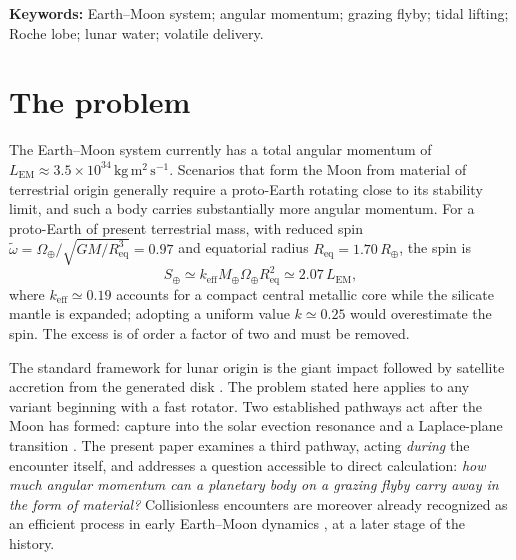 \documentclass[11pt,a4paper]{article}
\begin{document}
\begin{abstract}
The same calculation sharply delimits the scope of the mechanism. The lifted material does not itself reach the Roche limit once the encounter is inclined by the $20$--$25^\circ$ required to clear the disk; this channel therefore removes angular momentum without supplying the lunar mass. The angular-momentum vector carried away lies within $2^\circ$ of the spin axis, so the encounter does not compromise the observed obliquity. At the same time, the flyby geometry that optimizes this capture brings the perturber's own Roche lobe within reach of an expanded volatile envelope. In the proposed theory, this overflow would feed a volatile trail whose delayed reaccretion would supply mainly Earth's water and, to a lesser extent, contribute to the circumterrestrial reservoir and subsequently to the Moon.
\end{abstract}

\noindent\textbf{Keywords:} Earth--Moon system; angular momentum; grazing flyby; tidal lifting; Roche lobe; lunar water; volatile delivery.

\vspace{1em}
\section{The problem}

The Earth--Moon system currently has a total angular momentum of $L_{\mathrm{EM}} \approx 3.5 \times 10^{34}\,\mathrm{kg\,m^2\,s^{-1}}$. Scenarios that form the Moon from material of terrestrial origin generally require a proto-Earth rotating close to its stability limit, and such a body carries substantially more angular momentum. For a proto-Earth of present terrestrial mass, with reduced spin $\tilde{\omega} = \Omega_\oplus / \sqrt{GM/R_{\mathrm{eq}}^3}=0.97$ and equatorial radius $R_{\mathrm{eq}}=1.70\,R_\oplus$, the spin is
\begin{equation}
S_\oplus \simeq k_{\mathrm{eff}} M_\oplus \Omega_\oplus R_{\mathrm{eq}}^2 \simeq 2.07\,L_{\mathrm{EM}},
\end{equation}
where $k_{\mathrm{eff}}\simeq0.19$ accounts for a compact central metallic core while the silicate mantle is expanded; adopting a uniform value $k\simeq0.25$ would overestimate the spin. The excess is of order a factor of two and must be removed.

The standard framework for lunar origin is the giant impact followed by satellite accretion from the generated disk \cite{Canup2023, Ida1997, Salmon2012, Kokubo2000}. The problem stated here applies to any variant beginning with a fast rotator. Two established pathways act after the Moon has formed: capture into the solar evection resonance and a Laplace-plane transition \cite{Murray1999, Tremaine2009, Cuk2012}. The present paper examines a third pathway, acting \emph{during} the encounter itself, and addresses a question accessible to direct calculation: \emph{how much angular momentum can a planetary body on a grazing flyby carry away in the form of material?} Collisionless encounters are moreover already recognized as an efficient process in early Earth--Moon dynamics \cite{Pahlevan2015}, at a later stage of the history.
\end{document}
